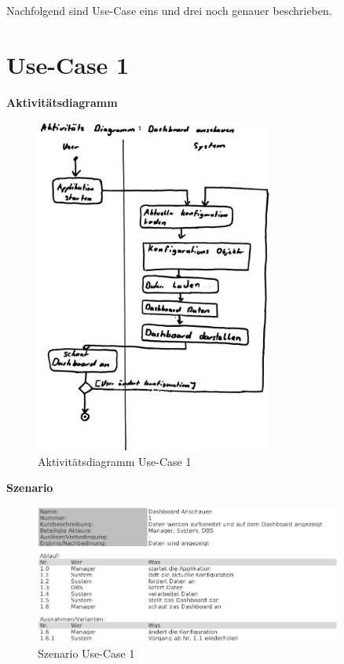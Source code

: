 \documentclass[a4paper]{scrreprt}
\begin{document}
\bigskip

Nachfolgend sind Use-Case eins und drei noch genauer beschrieben.


\pagebreak

\section{Use-Case 1}
\textbf{Aktivitätsdiagramm}

\begin{figure}[htbp]
\includegraphics[width=0.7\textwidth]{uc-1_Dashboard/uc1_activity.jpg}
\caption[Aktivitätsdiagramm Use-Case 1]{Aktivitätsdiagramm Use-Case 1}
\end{figure}

\pagebreak


\textbf{Szenario}

\begin{figure}[htbp]
\includegraphics[width=0.9\textwidth]{uc-1_Dashboard/uc1_scenario.png}
\caption[Szenario Use-Case 1]{Szenario Use-Case 1}
\end{figure}
\end{document}
